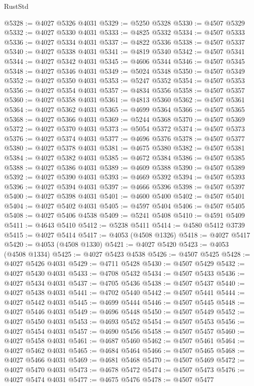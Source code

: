 \begin{lexlean}{RustStd}
\begin{coremodule}
@5328 := @4027 @5326 @4031
@5329 := @5250 @5328
@5330 := @4507 @5329
@5332 := @4027 @5330 @4031
@5333 := @4825 @5332
@5334 := @4507 @5333
@5336 := @4027 @5334 @4031
@5337 := @4822 @5336
@5338 := @4507 @5337
@5340 := @4027 @5338 @4031
@5341 := @4819 @5340
@5342 := @4507 @5341
@5344 := @4027 @5342 @4031
@5345 := @4606 @5344
@5346 := @4507 @5345
@5348 := @4027 @5346 @4031
@5349 := @5024 @5348
@5350 := @4507 @5349
@5352 := @4027 @5350 @4031
@5353 := @5247 @5352
@5354 := @4507 @5353
@5356 := @4027 @5354 @4031
@5357 := @4834 @5356
@5358 := @4507 @5357
@5360 := @4027 @5358 @4031
@5361 := @4813 @5360
@5362 := @4507 @5361
@5364 := @4027 @5362 @4031
@5365 := @4699 @5364
@5366 := @4507 @5365
@5368 := @4027 @5366 @4031
@5369 := @5244 @5368
@5370 := @4507 @5369
@5372 := @4027 @5370 @4031
@5373 := @5054 @5372
@5374 := @4507 @5373
@5376 := @4027 @5374 @4031
@5377 := @4696 @5376
@5378 := @4507 @5377
@5380 := @4027 @5378 @4031
@5381 := @4675 @5380
@5382 := @4507 @5381
@5384 := @4027 @5382 @4031
@5385 := @4672 @5384
@5386 := @4507 @5385
@5388 := @4027 @5386 @4031
@5389 := @4609 @5388
@5390 := @4507 @5389
@5392 := @4027 @5390 @4031
@5393 := @4669 @5392
@5394 := @4507 @5393
@5396 := @4027 @5394 @4031
@5397 := @4666 @5396
@5398 := @4507 @5397
@5400 := @4027 @5398 @4031
@5401 := @4600 @5400
@5402 := @4507 @5401
@5404 := @4027 @5402 @4031
@5405 := @4597 @5404
@5406 := @4507 @5405
@5408 := @4027 @5406 @4538
@5409 := @5241 @5408
@5410 := @4591 @5409
@5411 := @4643 @5410
@5412 := @5238 @5411
@5414 := @4580 @5412 @3739
@5415 := @4027 @5414
@5417 := @4053 (@4508 @1326)
@5418 := @4027 @5417
@5420 := @4053 (@4508 @1330)
@5421 := @4027 @5420
@5423 := @4053 (@4508 @1334)
@5425 := @4027 @5423 @4538
@5426 := @4507 @5425
@5428 := @4027 @5426 @4031
@5429 := @4711 @5428
@5430 := @4507 @5429
@5432 := @4027 @5430 @4031
@5433 := @4708 @5432
@5434 := @4507 @5433
@5436 := @4027 @5434 @4031
@5437 := @4705 @5436
@5438 := @4507 @5437
@5440 := @4027 @5438 @4031
@5441 := @4702 @5440
@5442 := @4507 @5441
@5444 := @4027 @5442 @4031
@5445 := @4699 @5444
@5446 := @4507 @5445
@5448 := @4027 @5446 @4031
@5449 := @4696 @5448
@5450 := @4507 @5449
@5452 := @4027 @5450 @4031
@5453 := @4693 @5452
@5454 := @4507 @5453
@5456 := @4027 @5454 @4031
@5457 := @4690 @5456
@5458 := @4507 @5457
@5460 := @4027 @5458 @4031
@5461 := @4687 @5460
@5462 := @4507 @5461
@5464 := @4027 @5462 @4031
@5465 := @4684 @5464
@5466 := @4507 @5465
@5468 := @4027 @5466 @4031
@5469 := @4681 @5468
@5470 := @4507 @5469
@5472 := @4027 @5470 @4031
@5473 := @4678 @5472
@5474 := @4507 @5473
@5476 := @4027 @5474 @4031
@5477 := @4675 @5476
@5478 := @4507 @5477

\end{coremodule}
\end{lexlean}

